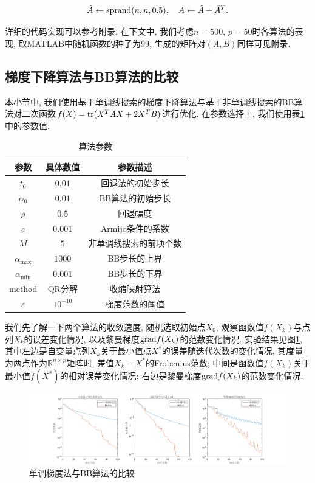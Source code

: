 \documentclass[UTF8]{ctexart}
\begin{document}
\[\hat{A}\leftarrow \textup{sprand}(n,n,0.5),\quad A\leftarrow \hat{A}+\hat{A}^T.\]

详细的代码实现可以参考附录. 在下文中, 我们考虑$n=500$, $p=50$时各算法的表现, 取MATLAB中随机函数的种子为$99$, 生成的矩阵对$(A,B)$同样可见附录.

\subsection{梯度下降算法与BB算法的比较}

本小节中, 我们使用基于单调线搜索的梯度下降算法与基于非单调线搜索的BB算法对二次函数$f(X)=\textup{tr}(X^T AX+2X^T B)$进行优化. 在参数选择上, 我们使用表\ref{tab1}中的参数值. 

\begin{table}[htb]
    \centering
    \begin{tabular}{c|cc}
        \hline
        \hline
        参数 & 具体数值 & 参数描述\\
        \hline
        $t_0$ & $0.01$ & 回退法的初始步长\\
        $\alpha_0$ & $0.01$ & BB算法的初始步长\\
        $\rho$ & $0.5$ & 回退幅度\\
        $c$ & $0.001$ & Armijo条件的系数\\
        $M$ & $5$ & 非单调线搜索的前项个数\\
        $\alpha_{\max}$ & $1000$ & BB步长的上界\\
        $\alpha_{\min}$ & $0.001$ & BB步长的下界\\
        method & QR分解 & 收缩映射算法\\
        $\varepsilon$ & $10^{-10}$ & 梯度范数的阈值\\
        \hline
        \hline
    \end{tabular}
    \caption{算法参数}\label{tab1}
\end{table}

我们先了解一下两个算法的收敛速度, 随机选取初始点$X_0$, 观察函数值$f(X_k)$与点列$X_k$的误差变化情况, 以及黎曼梯度$\textup{grad}f(X_k)$的范数变化情况. 实验结果见图\ref{fig1}, 其中左边是自变量点列$X_k$关于最小值点$X^*$的误差随迭代次数的变化情况, 其度量为两点作为$\mathbb{R}^{n\times p}$矩阵时, 差值$X_k-X^*$的Frobenius范数; 中间是函数值$f(X_k)$关于最小值$f(X^*)$的相对误差变化情况; 右边是黎曼梯度$\textup{grad}f(X_k)$的范数变化情况. 

\begin{figure}[htb]
    \centering
    \includegraphics[width=\textwidth]{Q2-figure/1.png}
    \caption{单调梯度法与BB算法的比较}\label{fig1}
\end{figure}
\end{document}
